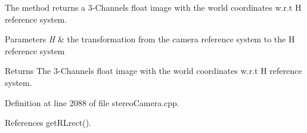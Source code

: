The method returns a 3-\/\+Channels float image with the world coordinates w.\+r.\+t H reference system. 


\begin{DoxyParams}{Parameters}
{\em H} & the transformation from the camera reference system to the H reference system \\
\hline
\end{DoxyParams}
\begin{DoxyReturn}{Returns}
The 3-\/\+Channels float image with the world coordinates w.\+r.\+t H reference system. 
\end{DoxyReturn}


Definition at line 2088 of file stereo\+Camera.\+cpp.



References get\+R\+Lrect().


